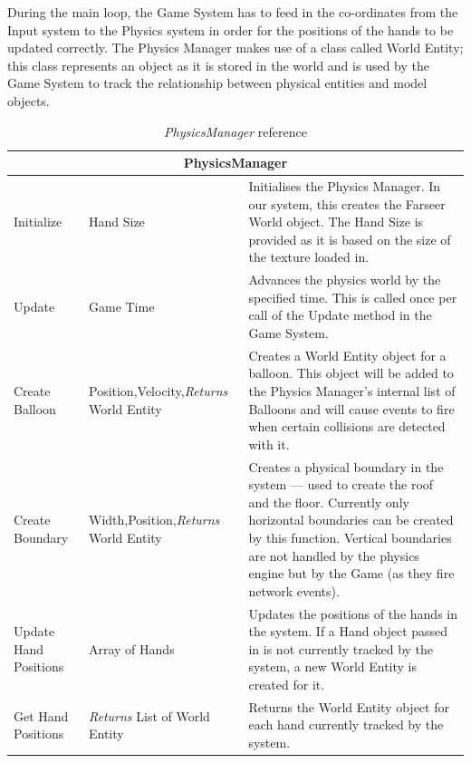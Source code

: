During the main loop, the Game System has to feed in the co-ordinates from the
Input system to the Physics system in order for the positions of the hands to 
be updated correctly. The Physics Manager makes use of a class called World
Entity; this class represents an object as it is stored in the world and is 
used by the Game System to track the relationship between physical entities and
model objects.

\begin{longtable}{|p{4.5cm}|p{3.5cm}|p{7.7cm}|}
\caption{\emph{PhysicsManager} reference \label{PhysicsManagerRef}}
\\
\hline
\multicolumn{3}{|c|}{PhysicsManager} \\ \hline

Initialize & Hand Size &
Initialises the Physics Manager. In our system, this creates the Farseer World
object. The Hand Size is provided as it is based on the size of the texture 
loaded in. \\ \hline

Update & Game Time &
Advances the physics world by the specified time. This is called once per call
of the Update method in the Game System.\\ \hline

Create Balloon & Position,\newline Velocity,\newline \emph{Returns} World Entity &
Creates a World Entity object for a balloon. This object will be added to the 
Physics Manager's internal list of Balloons and will cause events to fire when
certain collisions are detected with it.\\ \hline

Create Boundary & Width,\newline Position,\newline \emph{Returns} World Entity &
Creates a physical boundary in the system --- used to create the roof and the 
floor. Currently only horizontal boundaries can be created by this function.
Vertical boundaries are not handled by the physics engine but by the Game (as 
they fire network events).\\ \hline

Update Hand Positions & Array of Hands &
Updates the positions of the hands in the system. If a Hand object passed in 
is not currently tracked by the system, a new World Entity is created for it.
\\ \hline

Get Hand Positions & \emph{Returns} List of World Entity &
Returns the World Entity object for each hand currently tracked by the system.
\\ \hline


\end{longtable}
